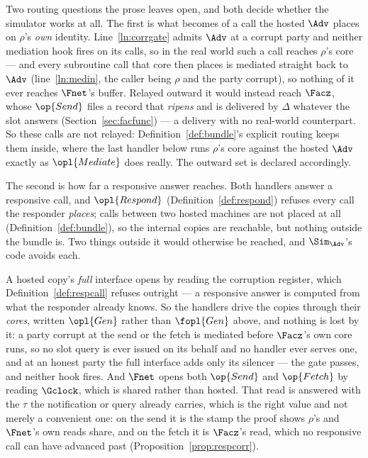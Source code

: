 \documentclass[10pt,oneside,openany]{book}
\theoremstyle{accentdef}
\theoremstyle{accentplain}
\begin{document}
Two routing questions the prose leaves open, and both decide whether the simulator works at all.
The first is what becomes of a call the hosted $\Adv$ places on $\rho$'s \emph{own} identity.
Line~\ref{ln:corrgate} admits $\Adv$ at a corrupt party and neither mediation hook fires on its
calls, so in the real world such a call reaches $\rho$'s core --- and every subroutine call that
core then places is mediated straight back to $\Adv$ (line~\ref{ln:medin}, the caller being $\rho$
and the party corrupt), so nothing of it ever reaches $\Fnet$'s buffer. Relayed outward it would
instead reach $\Facz$, whose $\op{Send}$ files a record that \emph{ripens} and is delivered by
$\Delta$ whatever the slot answers (Section~\ref{sec:facfunc}) --- a delivery with no real-world
counterpart. So these calls are not relayed: Definition~\ref{def:bundle}'s explicit routing keeps
them inside, where the last handler below runs $\rho$'s core against the hosted $\Adv$ exactly as
$\opl{Mediate}$ does really. The outward set is declared accordingly.

The second is how far a responsive answer reaches. Both handlers answer a responsive call, and
$\opl{Respond}$ (Definition~\ref{def:respond}) refuses every call the responder \emph{places};
calls between two hosted machines are not placed at all (Definition~\ref{def:bundle}), so the
internal copies are reachable, but nothing outside the bundle is. Two things outside it would
otherwise be reached, and $\Sim_{\Adv}$'s code avoids each.

A hosted copy's \emph{full} interface opens by reading the corruption register, which
Definition~\ref{def:respcall} refuses outright --- a responsive answer is computed from what the
responder already knows. So the handlers drive the copies through their \emph{cores}, written
$\opl{Gen}$ rather than $\fopl{Gen}$ above, and nothing is lost by it: a party corrupt at the send
or the fetch is mediated before $\Facz$'s own core runs, so no slot query is ever issued on its
behalf and no handler ever serves one, and at an honest party the full interface adds only its
silencer --- the gate passes, and neither hook fires. And $\Fnet$ opens both $\op{Send}$ and
$\op{Fetch}$ by reading $\Gclock$, which is shared rather than hosted. That read is answered with
the $\tau$ the notification or query already carries, which is the right value and not merely a
convenient one: on the send it is the stamp the proof shows $\rho$'s and $\Fnet$'s own reads
share, and on the fetch it is $\Facz$'s read, which no responsive call can have advanced past
(Proposition~\ref{prop:respcorr}).
\end{document}
